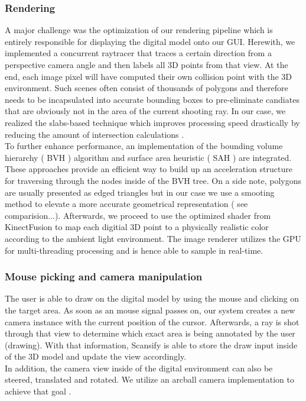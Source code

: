 \subsubsection{Rendering}
A major challenge was the optimization of our rendering pipeline which is entirely responsible for displaying the digital model onto our GUI. Herewith, we implemented a concurrent raytracer that traces a certain direction from a perspective camera angle and then labels all 3D points from that view. At the end, each image pixel will have computed their own collision point with the 3D environment. Such scenes often consist of thousands of polygons and therefore needs to be incapsulated into accurate bounding boxes to pre-eliminate candiates that are obviously not in the area of the current shooting ray. In our case, we realized the slabs-based technique which improves processing speed drastically by reducing the amount of intersection calculations \cite{mensmann2010slab}.\\
 To further enhance performance, an implementation of the bounding volume hierarchy ( BVH ) \cite{Karras:2013:FPC:2492045.2492055} algorithm and surface area heuristic ( SAH ) \cite{Karras:2013:FPC:2492045.2492055} are integrated. These approaches provide an efficient way to build up an acceleration structure for traversing through the nodes inside of the BVH tree. On a side note, polygons are usually presented as edged triangles but in our case we use a smooting method to elevate a more accurate geometrical representation ( see comparision...).
Afterwards, we proceed to use the optimized shader from KinectFusion to map each digitial 3D point to a physically realistic color according to the ambient light environment. The image renderer utilizes the GPU for multi-threading processing and is hence able to sample in real-time.
\subsubsection{Mouse picking and camera manipulation}
The user is able to draw on the digital model by using the mouse and clicking on the target area. As soon as an mouse signal passes on, our system creates a new camera instance with the current position of the cursor. Afterwards, a ray is shot through that view to determine which exact area is being annotated by the user (drawing). With that information, Scansify is able to store the draw input inside of the 3D model and update the view accordingly.\\
In addition, the camera view inside of the digital environment can also be steered, translated and rotated. We utilize an arcball camera implementation to achieve that goal \cite{Shoemake:1992:AUI:155294.155312}.
\raggedbottom
